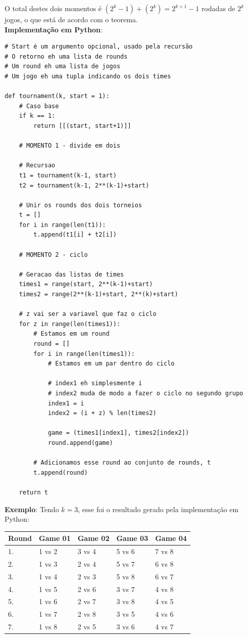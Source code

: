 \documentclass{article}
\begin{document}
O total destes dois momentos é $(2^k -1) + (2^k) = 2^{k+1} - 1$ rodadas de $2^k$ jogos, o que está de acordo com o teorema.\\

\textbf{Implementação em Python}:

{\color{ogreen}
\begin{verbatim}
# Start é um argumento opcional, usado pela recursão
# O retorno eh uma lista de rounds
# Um round eh uma lista de jogos
# Um jogo eh uma tupla indicando os dois times

def tournament(k, start = 1):
    # Caso base
    if k == 1:
        return [[(start, start+1)]]

    # MOMENTO 1 - divide em dois
    
    # Recursao
    t1 = tournament(k-1, start)
    t2 = tournament(k-1, 2**(k-1)+start)

    # Unir os rounds dos dois torneios
    t = []
    for i in range(len(t1)):
        t.append(t1[i] + t2[i])

    # MOMENTO 2 - ciclo
    
    # Geracao das listas de times
    times1 = range(start, 2**(k-1)+start)
    times2 = range(2**(k-1)+start, 2**(k)+start)
    
    # z vai ser a variavel que faz o ciclo
    for z in range(len(times1)):
        # Estamos em um round
        round = []
        for i in range(len(times1)):
            # Estamos em um par dentro do ciclo
            
            # index1 eh simplesmente i
            # index2 muda de modo a fazer o ciclo no segundo grupo
            index1 = i
            index2 = (i + z) % len(times2)

            game = (times1[index1], times2[index2])
            round.append(game)

        # Adicionamos esse round ao conjunto de rounds, t
        t.append(round)

    return t
\end{verbatim}
}

\textbf{Exemplo}: Tendo $k = 3$, esse foi o resultado gerado pela implementação em Python:\\

\begin{table}[H]
\centering
\begin{tabular}{l|l|l|l|l}
Round & Game 01 & Game 02 & Game 03 & Game 04\\\hline
1.& 1 vs 2 & 3 vs 4 & 5 vs 6 & 7 vs 8\\
2.& 1 vs 3 & 2 vs 4 & 5 vs 7 & 6 vs 8\\
3.& 1 vs 4 & 2 vs 3 & 5 vs 8 & 6 vs 7\\
4.& 1 vs 5 & 2 vs 6 & 3 vs 7 & 4 vs 8\\
5.& 1 vs 6 & 2 vs 7 & 3 vs 8 & 4 vs 5\\
6.& 1 vs 7 & 2 vs 8 & 3 vs 5 & 4 vs 6\\
7.& 1 vs 8 & 2 vs 5 & 3 vs 6 & 4 vs 7\\
\end{tabular}
\end{table}
\end{document}
